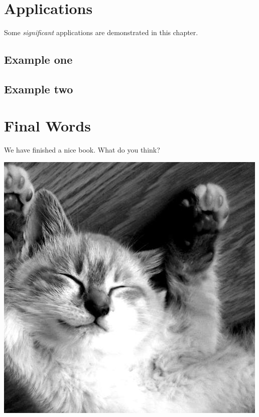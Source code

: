 \documentclass[
]{book}
\begin{document}
\hypertarget{applications}{%
\chapter{Applications}\label{applications}}

Some \emph{significant} applications are demonstrated in this chapter.

\hypertarget{example-one}{%
\section{Example one}\label{example-one}}

\hypertarget{example-two}{%
\section{Example two}\label{example-two}}

\hypertarget{final-words}{%
\chapter{Final Words}\label{final-words}}

We have finished a nice book. What do you think?

\includegraphics{images/500.jpg}
\end{document}
